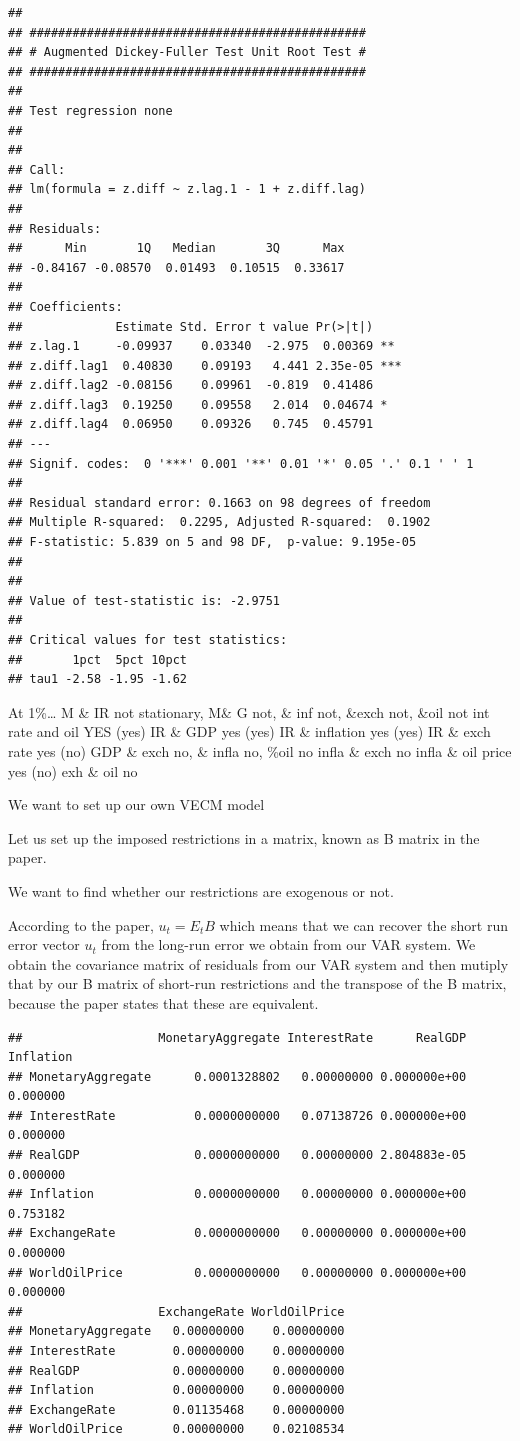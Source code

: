 \documentclass[11pt,preprint, authoryear]{elsarticle}
\numberwithin{equation}{section}
\numberwithin{figure}{section}
\numberwithin{table}{section}
\begin{document}
\begin{verbatim}
## 
## ############################################### 
## # Augmented Dickey-Fuller Test Unit Root Test # 
## ############################################### 
## 
## Test regression none 
## 
## 
## Call:
## lm(formula = z.diff ~ z.lag.1 - 1 + z.diff.lag)
## 
## Residuals:
##      Min       1Q   Median       3Q      Max 
## -0.84167 -0.08570  0.01493  0.10515  0.33617 
## 
## Coefficients:
##             Estimate Std. Error t value Pr(>|t|)    
## z.lag.1     -0.09937    0.03340  -2.975  0.00369 ** 
## z.diff.lag1  0.40830    0.09193   4.441 2.35e-05 ***
## z.diff.lag2 -0.08156    0.09961  -0.819  0.41486    
## z.diff.lag3  0.19250    0.09558   2.014  0.04674 *  
## z.diff.lag4  0.06950    0.09326   0.745  0.45791    
## ---
## Signif. codes:  0 '***' 0.001 '**' 0.01 '*' 0.05 '.' 0.1 ' ' 1
## 
## Residual standard error: 0.1663 on 98 degrees of freedom
## Multiple R-squared:  0.2295, Adjusted R-squared:  0.1902 
## F-statistic: 5.839 on 5 and 98 DF,  p-value: 9.195e-05
## 
## 
## Value of test-statistic is: -2.9751 
## 
## Critical values for test statistics: 
##       1pct  5pct 10pct
## tau1 -2.58 -1.95 -1.62
\end{verbatim}

At 1\%\ldots{} M \& IR not stationary, M\& G not, \& inf not, \&exch
not, \&oil not int rate and oil YES (yes) IR \& GDP yes (yes) IR \&
inflation yes (yes) IR \& exch rate yes (no) GDP \& exch no, \& infla
no, \%oil no infla \& exch no infla \& oil price yes (no) exh \& oil no

We want to set up our own VECM model

Let us set up the imposed restrictions in a matrix, known as B matrix in
the paper.

We want to find whether our restrictions are exogenous or not.

According to the paper, \(u_t=E_tB\) which means that we can recover the
short run error vector \(u_t\) from the long-run error we obtain from
our VAR system. We obtain the covariance matrix of residuals from our
VAR system and then mutiply that by our B matrix of short-run
restrictions and the transpose of the B matrix, because the paper states
that these are equivalent.

\begin{verbatim}
##                   MonetaryAggregate InterestRate      RealGDP Inflation
## MonetaryAggregate      0.0001328802   0.00000000 0.000000e+00  0.000000
## InterestRate           0.0000000000   0.07138726 0.000000e+00  0.000000
## RealGDP                0.0000000000   0.00000000 2.804883e-05  0.000000
## Inflation              0.0000000000   0.00000000 0.000000e+00  0.753182
## ExchangeRate           0.0000000000   0.00000000 0.000000e+00  0.000000
## WorldOilPrice          0.0000000000   0.00000000 0.000000e+00  0.000000
##                   ExchangeRate WorldOilPrice
## MonetaryAggregate   0.00000000    0.00000000
## InterestRate        0.00000000    0.00000000
## RealGDP             0.00000000    0.00000000
## Inflation           0.00000000    0.00000000
## ExchangeRate        0.01135468    0.00000000
## WorldOilPrice       0.00000000    0.02108534
\end{verbatim}
\end{document}

